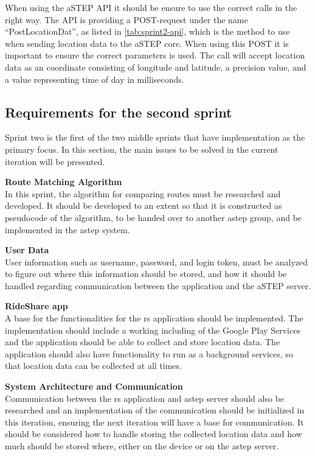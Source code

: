 When using the aSTEP API it should be ensure to use the correct calls in the right way.
The API is providing a POST-request under the name ``PostLocationDat'', as listed in \ref{tab:sprint2-api}, which is the method to use when sending location data to the aSTEP core.
When using this POST it is important to ensure the correct parameters is used.
The call will accept location data as an coordinate consisting of longitude and latitude, a precision value, and a value representing time of day in milliseconds.

\subsection{Requirements for the second sprint}
Sprint two is the first of the two middle sprints that have implementation as the primary focus. In this section, the main issues to be solved in the current iteration will be presented.

\textbf{Route Matching Algorithm}\\
In this sprint, the algorithm for comparing routes must be researched and developed. 
It should be developed to an extent so that it is constructed as pseudocode of the algorithm, to be handed over to another \gls{astep} group, and be implemented in the \gls{astep} system.

\textbf{User Data}\\
User information such as username, password, and login token, must be analyzed to figure out where this information should be stored, and how it should be handled regarding communication between the application and the aSTEP server. 

\textbf{RideShare app}\\
A base for the functionalities for the \gls{rs} application should be implemented. 
The implementation should include a working  including of the Google Play Services and the application should be able to collect and store location data. 
The application should also have functionality to run as a background services, so that location data can be collected at all times.

\textbf{System Architecture and Communication}\\
Communication between the \gls{rs} application and \gls{astep} server should also be researched and an implementation of the communication should be initialized in this iteration, ensuring the next iteration will have a base for communication. 
It should be considered how to handle storing the collected location data and how much should be stored where, either on the device or on the \gls{astep} server.

